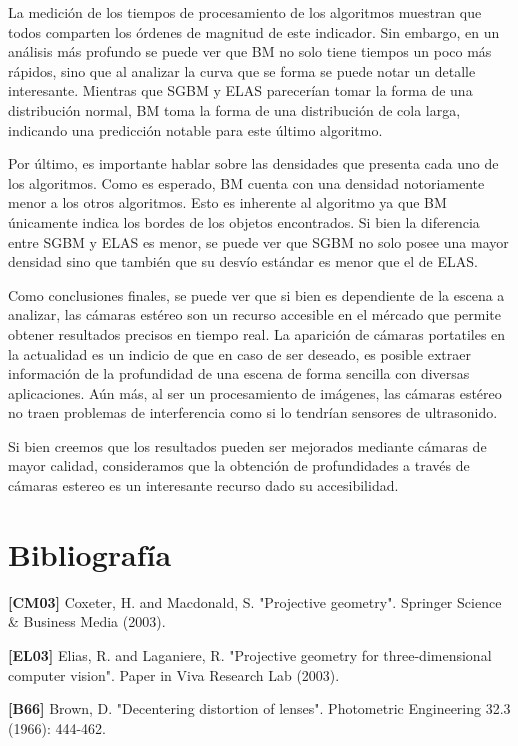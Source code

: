 \documentclass[11pt,a4paper,titlepage]{article}
\begin{document}
La medición de los tiempos de procesamiento de los algoritmos muestran que todos comparten los órdenes de magnitud de este indicador. Sin embargo, en un análisis más profundo se puede ver que BM no solo tiene tiempos un poco más rápidos, sino que al analizar la curva que se forma se puede notar un detalle interesante. Mientras que SGBM y ELAS parecerían tomar la forma de una distribución normal, BM toma la forma de una distribución de cola larga, indicando una predicción notable para este último algoritmo.

Por último, es importante hablar sobre las densidades que presenta cada uno de los algoritmos. Como es esperado, BM cuenta con una densidad notoriamente menor a los otros algoritmos. Esto es inherente al algoritmo ya que BM únicamente indica los bordes de los objetos encontrados. Si bien la diferencia entre SGBM y ELAS es menor, se puede ver que SGBM no solo posee una mayor densidad sino que también que su desvío estándar es menor que el de ELAS.

Como conclusiones finales, se puede ver que si bien es dependiente de la escena a analizar, las cámaras estéreo son un recurso accesible en el mércado que permite obtener resultados precisos en tiempo real. La aparición de cámaras portatiles en la actualidad es un indicio de que en caso de ser deseado, es posible extraer información de la profundidad de una escena de forma sencilla con diversas aplicaciones.
Aún más, al ser un procesamiento de imágenes, las cámaras estéreo no traen problemas de interferencia como si lo tendrían sensores de ultrasonido.

Si bien creemos que los resultados pueden ser mejorados mediante cámaras de mayor calidad, consideramos que la obtención de profundidades a través de cámaras estereo es un interesante recurso dado su accesibilidad.

\newpage

\section{Bibliografía}

\textbf{[CM03]} Coxeter, H. and Macdonald, S. "Projective geometry". Springer Science \& Business Media (2003).

\textbf{[EL03]} Elias, R. and Laganiere, R. "Projective geometry for three-dimensional computer vision". Paper in Viva Research Lab (2003).

\textbf{[B66]} Brown, D. "Decentering distortion of lenses". Photometric Engineering 32.3 (1966): 444-462.
\end{document}
